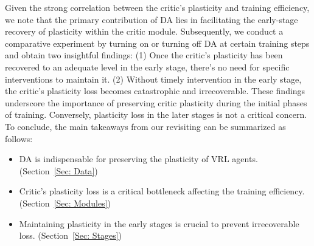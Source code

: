 Given the strong correlation between the critic's plasticity and training efficiency, we note that the primary contribution of DA lies in facilitating the early-stage recovery of plasticity within the critic module.
Subsequently, we conduct a comparative experiment by turning on or turning off DA at certain training steps and obtain two insightful findings:
(1) Once the critic's plasticity has been recovered to an adequate level in the early stage, there's no need for specific interventions to maintain it.
(2) Without timely intervention in the early stage, the critic's plasticity loss becomes catastrophic and irrecoverable.
These findings underscore the importance of preserving critic plasticity during the initial phases of training. Conversely, plasticity loss in the later stages is not a critical concern.
To conclude, the main takeaways from our revisiting can be summarized as follows:
\begin{itemize}[itemsep=0pt,parsep=1pt,topsep=0pt,partopsep=0pt]
    \item DA is indispensable for preserving the plasticity of VRL agents. (Section~\ref{Sec: Data})
    \item Critic's plasticity loss is a critical bottleneck affecting the training efficiency. (Section~\ref{Sec: Modules})
    \item Maintaining plasticity in the early stages is crucial to prevent irrecoverable loss. (Section~\ref{Sec: Stages})
\end{itemize}

